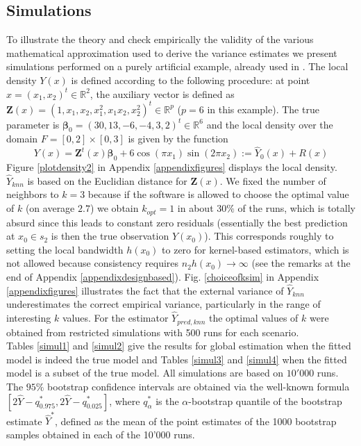 \documentclass[a4paper,12pt,leqno, titlepage]{article}
\newcommand{\R}{\mathbb{R}}
\begin{document}
 \subsection{Simulations}\label{simul}
 To illustrate the theory and check empirically the validity of the various mathematical approximation used to derive the variance estimates we present simulations performed on a purely artificial example, already used in \cite{mandallaz3}. The local density $Y(x)$ is defined according to the following procedure: at point $x=(x_1,x_2)^t\in\R^2$, the auxiliary vector is defined as $\pmb{Z}(x)=(1,x_1,x_2,x_1^2,x_1x_2,x_2^2)^t\in\R^p$ ($p=6$ in this example). The true parameter is
 $\pmb{\beta}_0=(30,13,-6,-4,3,2)^t\in\R^6$ and the local density over the domain $F=[0,2]\times [0,3]$ is given by the function
 \begin{equation}\label{simul1}
 Y(x)=\pmb{Z}^t(x)\pmb{\beta}_0+6\cos(\pi x_1)\sin(2\pi x_2):=\hat{Y}_0(x)+R(x)
 \end{equation}
 Figure \ref{plotdensity2} in Appendix \ref{appendixfigures} displays the local density.\\
 $\hat{Y}_{knn}$ is based on the Euclidian distance for $\pmb{Z}(x)$. We fixed the number of neighbors to $k=3$ because if the software is allowed to choose the optimal value of $k$ (on average $2.7$) we obtain $k_{opt}=1$ in about $30\%$ of the runs, which is totally absurd since this leads to constant zero residuals (essentially the best prediction at $x_0\in{s_2}$ is then the true observation $Y(x_0)$). This corresponds roughly to setting the local bandwidth $h(x_0)$ to zero for kernel-based estimators, which is not allowed because consistency requires $n_2h(x_0) \to \infty$ (see the remarks at the end of Appendix \ref{appendixdesignbased}). Fig. \ref{choiceofksim} in Appendix \ref{appendixfigures} illustrates the fact that the external variance of $\hat{Y}_{knn}$ underestimates the correct empirical variance, particularly in the range of interesting $k$ values. For the estimator $\hat{Y}_{pred,knn}$ the optimal values of $k$ were obtained from restricted simulations with 500 runs for each scenario.\\
 Tables \ref{simul1} and \ref{simul2} give the results for global estimation when the fitted model is indeed the true model and Tables \ref{simul3} and \ref{simul4} when the fitted model is a subset of the true model. All simulations are based on $10'000$ runs. The $95\%$ bootstrap confidence intervals are obtained via the well-known formula
 $[2\hat{Y}-q^{*}_{0.975},2\hat{Y}-q^{*}_{0.025}]$, where $q^{*}_{\alpha}$ is the $\alpha$-bootstrap quantile of the bootstrap estimate $\hat{Y}^{*}$, defined as the mean of the point estimates of the 1000 bootstrap samples obtained in each of the 10'000 runs.
 \clearpage\newpage
\end{document}
